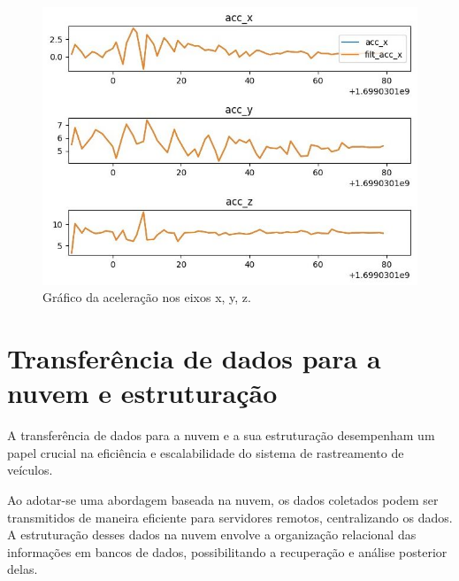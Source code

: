 \begin{figure}[hp]
    \centering
    
    \includegraphics[scale=0.8]{figures/acelaracao.jpg}
    
    \caption{Gráfico da aceleração nos eixos x, y, z.}
    
    \label{fig:aceleracao}
\end{figure}

    
    
    

\section{Transferência de dados para a nuvem e estruturação}

A transferência de dados para a nuvem e a sua estruturação desempenham um papel crucial na eficiência e escalabilidade do sistema de rastreamento de veículos. 

Ao adotar-se uma abordagem baseada na nuvem, os dados coletados podem ser transmitidos de maneira eficiente para servidores remotos, centralizando os dados. A estruturação desses dados na nuvem envolve a organização relacional das informações em bancos de dados, possibilitando a recuperação e análise posterior delas. 


